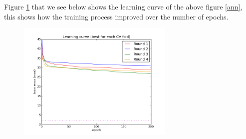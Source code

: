 Figure \ref{ann2} that we see below shows the learning curve of the above figure \ref{ann}, this shows how the training process improved over the number of epochs.
\begin{figure}[H]
\centering
\includegraphics[width=7.5cm, keepaspectratio=true]{pictures/ann_21_4_230.png}
\vspace{-0.4cm}
\caption{\footnotesize }
\label{ann2}
\end{figure}